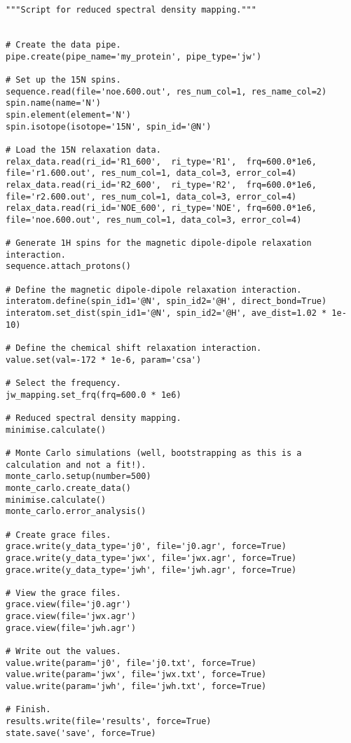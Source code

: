 \begin{lstlisting}
"""Script for reduced spectral density mapping."""


# Create the data pipe.
pipe.create(pipe_name='my_protein', pipe_type='jw')

# Set up the 15N spins.
sequence.read(file='noe.600.out', res_num_col=1, res_name_col=2)
spin.name(name='N')
spin.element(element='N')
spin.isotope(isotope='15N', spin_id='@N')

# Load the 15N relaxation data.
relax_data.read(ri_id='R1_600',  ri_type='R1',  frq=600.0*1e6, file='r1.600.out', res_num_col=1, data_col=3, error_col=4)
relax_data.read(ri_id='R2_600',  ri_type='R2',  frq=600.0*1e6, file='r2.600.out', res_num_col=1, data_col=3, error_col=4)
relax_data.read(ri_id='NOE_600', ri_type='NOE', frq=600.0*1e6, file='noe.600.out', res_num_col=1, data_col=3, error_col=4)

# Generate 1H spins for the magnetic dipole-dipole relaxation interaction.
sequence.attach_protons()

# Define the magnetic dipole-dipole relaxation interaction.
interatom.define(spin_id1='@N', spin_id2='@H', direct_bond=True)
interatom.set_dist(spin_id1='@N', spin_id2='@H', ave_dist=1.02 * 1e-10)

# Define the chemical shift relaxation interaction.
value.set(val=-172 * 1e-6, param='csa')

# Select the frequency.
jw_mapping.set_frq(frq=600.0 * 1e6)

# Reduced spectral density mapping.
minimise.calculate()

# Monte Carlo simulations (well, bootstrapping as this is a calculation and not a fit!).
monte_carlo.setup(number=500)
monte_carlo.create_data()
minimise.calculate()
monte_carlo.error_analysis()

# Create grace files.
grace.write(y_data_type='j0', file='j0.agr', force=True)
grace.write(y_data_type='jwx', file='jwx.agr', force=True)
grace.write(y_data_type='jwh', file='jwh.agr', force=True)

# View the grace files.
grace.view(file='j0.agr')
grace.view(file='jwx.agr')
grace.view(file='jwh.agr')

# Write out the values.
value.write(param='j0', file='j0.txt', force=True)
value.write(param='jwx', file='jwx.txt', force=True)
value.write(param='jwh', file='jwh.txt', force=True)

# Finish.
results.write(file='results', force=True)
state.save('save', force=True)
\end{lstlisting}



